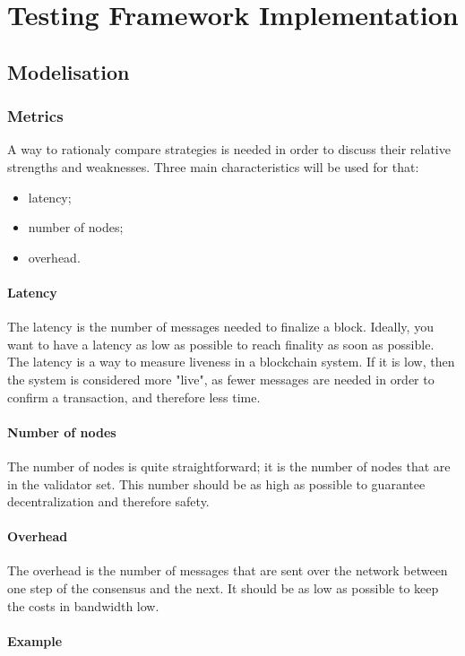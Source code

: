 \chapter{Testing Framework Implementation}
\label{chap:implementation}
\section{Modelisation}
\subsection{Metrics}
\FloatBarrier
A way to rationaly compare strategies is needed in order to discuss their
relative strengths and weaknesses. Three main characteristics will be used for
that:
\begin{itemize}
        \item latency;
        \item number of nodes;
        \item overhead.
\end{itemize}

\subsubsection{Latency}
The latency is the number of messages needed to finalize a block. Ideally, you
want to have a latency as low as possible to reach finality as soon as possible.
The latency is a way to measure liveness in a blockchain system. If it is low,
then the system is considered more "live", as fewer messages are needed in order
to confirm a transaction, and therefore less time.

\subsubsection{Number of nodes}
The number of nodes is quite straightforward; it is the number of nodes that are
in the validator set. This number should be as high as possible to guarantee
decentralization and therefore safety.

\subsubsection{Overhead}
The overhead is the number of messages that are sent over the network between
one step of the consensus and the next. It should be as low as possible to keep
the costs in bandwidth low.

\subsubsection{Example}

